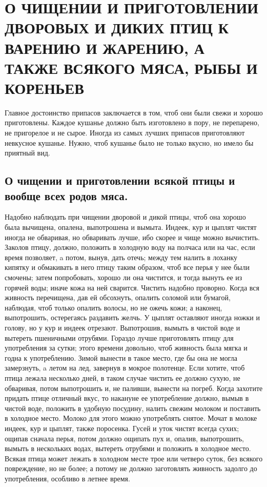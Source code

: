 \section{О ЧИЩЕНИИ И ПРИГОТОВЛЕНИИ ДВОРОВЫХ И ДИКИХ ПТИЦ К ВАРЕНИЮ И ЖАРЕНИЮ, А ТАКЖЕ ВСЯКОГО МЯСА, РЫБЫ И КОРЕНЬЕВ}

Главное достоинство припасов заключается в том, чтоб они были свежи и хорошо приготовлены. Каждое кушанье должно быть изготовлено в пору, не перепарено, не пригорелое и не сырое. Иногда из самых лучших припасов приготовляют невкусное кушанье. Нужно, чтоб кушанье было не только вкусно, но имело бы приятный вид.

\subsection*{О чищении и приготовлении всякой птицы и вообще всех родов мяса.}

Надобно наблюдать при чищении дворовой и дикой птицы, чтоб она хорошо была вычищена, опалена, выпотрошена и вымыта. Индеек, кур и цыплят чистят иногда не обваривая, но обваривать лучше, ибо скорее и чище можно вычистить. Заколов птицу, должно, положить в холодную воду на полчаса или на час, если время позволяет, a потом, вынув, дать отечь; между тем налить в лоханку кипятку и обмакивать в него птицу таким образом, чтоб все перья у нее были смочены; затем попробовать, хорошо ли она чистится, и тогда вынуть ее из горячей воды; иначе кожа на ней сварится. Чистить надобно проворно. Когда вся живность перечищена, дав ей обсохнуть, опалить соломой или бумагой, наблюдая, чтоб только опалить волосы, но не ожечь кожи; а наконец, выпотрошить, остерегаясь раздавить желчь. У цыплят оставляют иногда ножки и голову, но у кур и индеек отрезают. Выпотрошив, вымыть в чистой воде и вытереть пшеничными отрубями. Гораздо лучше приготовлять птицу для употребления за сутки; этого времени довольно, чтоб живность была мягка и годна к употреблению. Зимой вынести в такое место, где бы она не могла замерзнуть, a летом на лед, завернув в мокрое полотенце. Если хотите, чтоб птица лежала несколько дней, в таком случае чистить ее должно сухую, не обваривая, потом выпотрошить и, не паливши, вынести на погреб. Когда захотите придать птице отличный вкус, то накануне ее употребление должно, вымыв в чистой воде, положить в удобную посудину, налить свежим молоком и поставить в холодное место. Молоко для этого можно употреблять снятое. Мочат в молоке индеек, кур и цыплят, также поросенка. Гусей и уток чистят всегда сухих; ощипав сначала перья, потом должно ощипать пух и, опалив, выпотрошить, вымыть в нескольких водах, вытереть отрубями и положить в холодное место. Всякая птица может лежать в холодном месте трое или четверо суток, без всякого повреждение, но не более; а потому не должно заготовлять живность задолго до употребления, особливо в летнее время.

